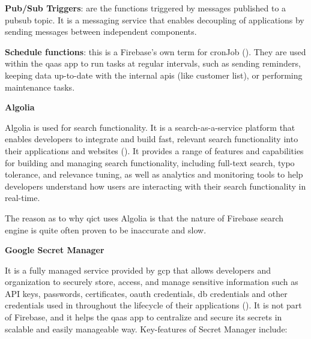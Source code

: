 \textbf{Pub/Sub Triggers}: are the functions triggered by messages published to a \acrshort{pubsub} topic.
It is a messaging service that enables decoupling of applications by sending messages between independent components.

\textbf{Schedule functions}: this is a Firebase's own term for \gls{cronJob} (\textit{\cite{scheduleFunction}}).
They are used within the \acrshort{qaas} app to run tasks at regular intervals, such as sending reminders, keeping
data up-to-date with the internal \acrshort{api}s (like customer list), or performing maintenance tasks.

\textbf{Algolia}

Algolia is used for search functionality. It is a search-as-a-service platform that enables developers to
integrate and build fast, relevant search functionality into their applications and websites
(\textit{\cite{algolia}}). It provides a range of features and capabilities for building and managing search
functionality, including full-text search, typo tolerance, and relevance tuning, as well as analytics and
monitoring tools to help developers understand how users are interacting with their search functionality in
real-time.

The reason as to why \acrshort{qict} uses Algolia is that the nature of Firebase search engine is quite often
proven to be inaccurate and slow.

\textbf{Google Secret Manager}

It is a fully managed service provided by \acrshort{gcp} that allows developers and organization to securely store,
access, and manage sensitive information such as API keys, passwords, certificates, \acrshort{oauth} credentials,
\acrshort{db} credentials and other credentials used in throughout the lifecycle of their applications
(\textit{\cite{googlesecretmanager}}). It is not part of Firebase, and it helps the \acrshort{qaas} app to centralize and
secure its secrets in scalable and easily manageable way. Key-features of Secret Manager include:

